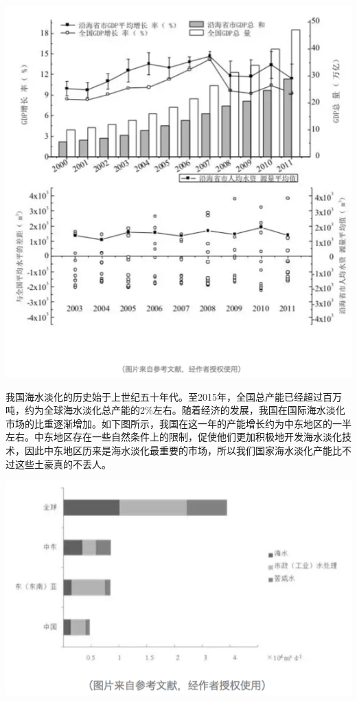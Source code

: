 \documentclass[]{book}
\begin{document}
\includegraphics[width=7.76in]{images/seawater3}

我国海水淡化的历史始于上世纪五十年代。至2015年，全国总产能已经超过百万吨，约为全球海水淡化总产能的2\%左右。随着经济的发展，我国在国际海水淡化市场的比重逐渐增加。如下图所示，我国在这一年的产能增长约为中东地区的一半左右。中东地区存在一些自然条件上的限制，促使他们更加积极地开发海水淡化技术，因此中东地区历来是海水淡化最重要的市场，所以我们国家海水淡化产能比不过这些土豪真的不丢人。

\includegraphics[width=8.33in]{images/seawater4}
\end{document}
